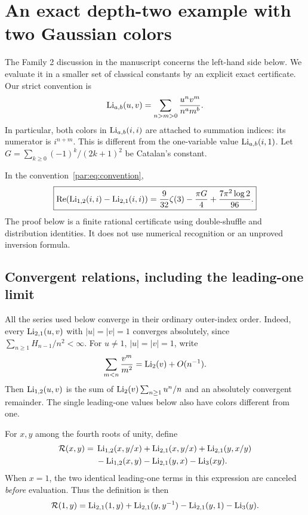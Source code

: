 \section{An exact depth-two example with two Gaussian colors}
\label{par:sec:two-colors}

The Family 2 discussion in the manuscript \cite{repo} concerns
the left-hand side below. We evaluate it in a smaller set of
classical constants by an explicit exact certificate. Our strict convention is
\begin{equation}\label{par:eq:convention}
 \operatorname{Li}_{a,b}(u,v)=\sum_{n>m>0}\frac{u^n v^m}{n^a m^b}.
\end{equation}
In particular, both colors in $\operatorname{Li}_{a,b}(i,i)$ are attached to
summation indices: its numerator is $i^{n+m}$.
This is different from the one-variable value $\operatorname{Li}_{a,b}(i,1)$.
Let $G=\sum_{k\ge0}(-1)^k/(2k+1)^2$ be Catalan's constant.

\begin{theorem}\label{par:thm:two-colors}
In the convention~\eqref{par:eq:convention},
\begin{equation}\label{par:eq:example}
 \boxed{\displaystyle
 \operatorname{Re}\!\left(\operatorname{Li}_{1,2}(i,i)-\operatorname{Li}_{2,1}(i,i)\right)
 =\frac{9}{32}\zeta(3)-\frac{\pi G}{4}
      +\frac{7\pi^2\log2}{96}.}
\end{equation}
The proof below is a finite rational certificate using double-shuffle
and distribution identities. It does not use numerical recognition or
an unproved inversion formula.
\end{theorem}

\subsection{Convergent relations, including the leading-one limit}

All the series used below converge in their ordinary outer-index order.
Indeed, every $\operatorname{Li}_{2,1}(u,v)$ with $|u|=|v|=1$ converges absolutely,
since $\sum_{n\ge1}H_{n-1}/n^2<\infty$.
For $u\ne1$, $|u|=|v|=1$, write
\[
 \sum_{m<n}\frac{v^m}{m^2}=\operatorname{Li}_2(v)+O(n^{-1}).
\]
Then $\operatorname{Li}_{1,2}(u,v)$ is the sum of
$\operatorname{Li}_2(v)\sum_{n\ge1}u^n/n$ and an absolutely convergent remainder.
The single leading-one values below also have colors different from one.

For $x,y$ among the fourth roots of unity, define
\begin{align}\label{par:eq:R}
 \mathcal R(x,y)={}&
 \operatorname{Li}_{1,2}(x,y/x)+\operatorname{Li}_{2,1}(x,y/x)
       +\operatorname{Li}_{2,1}(y,x/y)\notag\\
 &-\operatorname{Li}_{1,2}(x,y)-\operatorname{Li}_{2,1}(y,x)-\operatorname{Li}_3(xy).
\end{align}
When $x=1$, the two identical leading-one terms in this expression
are canceled \emph{before} evaluation. Thus the definition is then
\begin{equation}\label{par:eq:R-limit}
 \mathcal R(1,y)=
 \operatorname{Li}_{2,1}(1,y)+\operatorname{Li}_{2,1}(y,y^{-1})
       -\operatorname{Li}_{2,1}(y,1)-\operatorname{Li}_3(y).
\end{equation}

